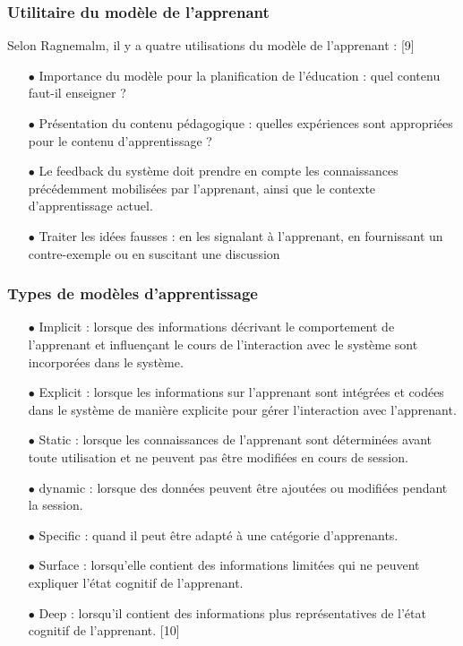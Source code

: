\subsubsection{Utilitaire du modèle de l'apprenant}
Selon Ragnemalm, il y a quatre utilisations du modèle de l’apprenant : [9]
\begin{itemize}
	\item[$\bullet$] Importance du modèle pour la planification de l’éducation : quel contenu faut-il enseigner ?
	\item[$\bullet$] Présentation du contenu pédagogique : quelles expériences sont appropriées pour le contenu d’apprentissage ?
	\item[$\bullet$] Le feedback du système doit prendre en compte les connaissances précédemment mobilisées par l'apprenant, ainsi que le contexte d'apprentissage actuel.
	\item[$\bullet$] Traiter les idées fausses : en les signalant à l'apprenant, en fournissant un contre-exemple ou en suscitant une discussion
\end{itemize}

\subsubsection{Types de modèles d'apprentissage}
\begin{itemize}
	\item[$\bullet$] Implicit : lorsque des informations décrivant le comportement de l'apprenant et influençant le cours de l'interaction avec le système sont incorporées dans le système.
	\item[$\bullet$] Explicit : lorsque les informations sur l'apprenant sont intégrées et codées dans le système de manière explicite pour gérer l'interaction avec l'apprenant.
	\item[$\bullet$] Static : lorsque les connaissances de l'apprenant sont déterminées avant toute utilisation et ne peuvent pas être modifiées en cours de session.
	\item[$\bullet$] dynamic : lorsque des données peuvent être ajoutées ou modifiées pendant la session.
	\item[$\bullet$] Specific : quand il peut être adapté à une catégorie d'apprenants.
	\item[$\bullet$] Surface : lorsqu'elle contient des informations limitées qui ne peuvent expliquer l'état cognitif de l'apprenant.
	\item[$\bullet$] Deep : lorsqu'il contient des informations plus représentatives de l'état cognitif de l'apprenant. [10]
\end{itemize}

